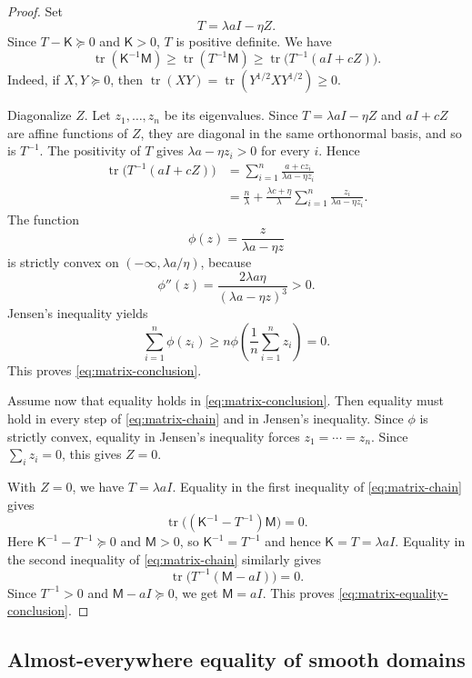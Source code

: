 \documentclass[10pt,a4paper]{amsart}
\DeclareMathOperator{\tr}{tr}
\newcommand{\Id}{I}
\newcommand{\mcM}{\mathsf M}
\newcommand{\mcK}{\mathsf K}
\begin{document}
\begin{proof}
Set
$$
        T=\lambda a\Id-\eta Z.
$$
Since $T-\mcK\succeq0$ and $\mcK>0$, $T$ is positive definite.
We have
\begin{equation}\label{eq:matrix-chain}
        \tr(\mcK^{-1}\mcM)
        \ge \tr(T^{-1}\mcM)
        \ge \tr\bigl(T^{-1}(a\Id+cZ)\bigr).
\end{equation}
Indeed, if $X,Y\succeq0$, then $\tr(XY)=\tr(Y^{1/2}XY^{1/2})\ge0$.

Diagonalize $Z$.  Let $z_1,\dots,z_n$ be its eigenvalues.  Since $T=\lambda a\Id-\eta Z$ and $a\Id+cZ$ are affine functions of $Z$, they are diagonal in the same orthonormal basis, and so is $T^{-1}$.  
The positivity of $T$ gives $\lambda a-\eta z_i>0$ for every $i$.  Hence
\begin{align*}
        \tr\bigl(T^{-1}(a\Id+cZ)\bigr)
        &=\sum_{i=1}^n\frac{a+cz_i}{\lambda a-\eta z_i}\\
        &=\frac{n}{\lambda}
        +\frac{\lambda c+\eta}{\lambda}
        \sum_{i=1}^n\frac{z_i}{\lambda a-\eta z_i}.
\end{align*}
The function
$$
        \phi(z)=\frac{z}{\lambda a-\eta z}
$$
is strictly convex on $(-\infty,\lambda a/\eta)$, because
$$
        \phi''(z)=\frac{2\lambda a\eta}{(\lambda a-\eta z)^3}>0.
$$
Jensen's inequality yields
$$
        \sum_{i=1}^n\phi(z_i)
        \ge n\phi\left(\frac1n\sum_{i=1}^nz_i\right)=0.
$$
This proves \eqref{eq:matrix-conclusion}.

Assume now that equality holds in \eqref{eq:matrix-conclusion}.  Then equality must hold in every step of \eqref{eq:matrix-chain} and in Jensen's inequality.  Since $\phi$ is strictly convex, equality in Jensen's inequality forces $z_1=\cdots=z_n$.  Since $\sum_i z_i=0$, this gives $Z=0$.

With $Z=0$, we have $T=\lambda a\Id$.  Equality in the first inequality of \eqref{eq:matrix-chain} gives
$$
        \tr\bigl((\mcK^{-1}-T^{-1})\mcM\bigr)=0.
$$
Here $\mcK^{-1}-T^{-1}\succeq0$ and $\mcM>0$, so $\mcK^{-1}=T^{-1}$ and hence $\mcK=T=\lambda a\Id$.  Equality in the second inequality of \eqref{eq:matrix-chain} similarly gives
$$
        \tr\bigl(T^{-1}(\mcM-a\Id)\bigr)=0.
$$
Since $T^{-1}>0$ and $\mcM-a\Id\succeq0$, we get $\mcM=a\Id$.  This proves \eqref{eq:matrix-equality-conclusion}.
\end{proof}



\subsection{Almost-everywhere equality of smooth domains}
\end{document}
